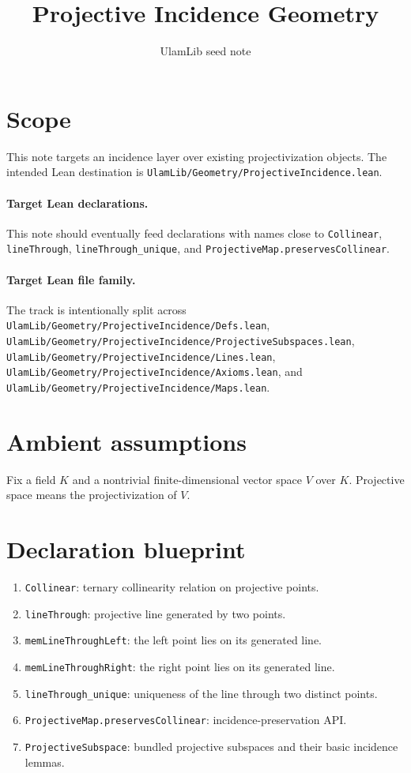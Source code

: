 \documentclass[11pt]{article}
\title{Projective Incidence Geometry}
\author{UlamLib seed note}
\date{}
\begin{document}
\maketitle

\section{Scope}

This note targets an incidence layer over existing projectivization objects.
The intended Lean destination is
\texttt{UlamLib/Geometry/ProjectiveIncidence.lean}.

\paragraph{Target Lean declarations.}
This note should eventually feed declarations with names close to
\texttt{Collinear}, \texttt{lineThrough}, \texttt{lineThrough\_unique}, and
\texttt{ProjectiveMap.preservesCollinear}.

\paragraph{Target Lean file family.}
The track is intentionally split across
\texttt{UlamLib/Geometry/ProjectiveIncidence/Defs.lean},
\texttt{UlamLib/Geometry/ProjectiveIncidence/ProjectiveSubspaces.lean},
\texttt{UlamLib/Geometry/ProjectiveIncidence/Lines.lean},
\texttt{UlamLib/Geometry/ProjectiveIncidence/Axioms.lean}, and
\texttt{UlamLib/Geometry/ProjectiveIncidence/Maps.lean}.

\section{Ambient assumptions}

Fix a field $K$ and a nontrivial finite-dimensional vector space $V$ over $K$.
Projective space means the projectivization of $V$.

\section{Declaration blueprint}

\begin{enumerate}
\item \texttt{Collinear}: ternary collinearity relation on projective points.
\item \texttt{lineThrough}: projective line generated by two points.
\item \texttt{memLineThroughLeft}: the left point lies on its generated line.
\item \texttt{memLineThroughRight}: the right point lies on its generated line.
\item \texttt{lineThrough\_unique}: uniqueness of the line through two distinct
points.
\item \texttt{ProjectiveMap.preservesCollinear}: incidence-preservation API.
\item \texttt{ProjectiveSubspace}: bundled projective subspaces and their basic
incidence lemmas.
\end{enumerate}
\end{document}
